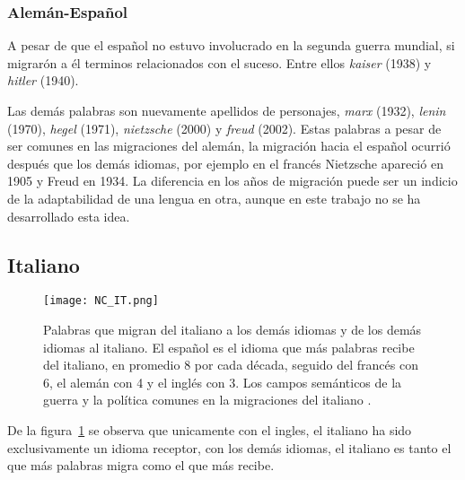 

  
\subsubsection*{Alemán-Español}%

A pesar de que el español no estuvo involucrado en la segunda guerra mundial, si migrarón a él terminos relacionados con el suceso.  Entre ellos \textit{kaiser} (1938) y \textit{hitler} (1940). 

Las demás palabras son nuevamente  apellidos de personajes, \textit{marx} (1932), \textit{lenin} (1970), \textit{hegel} (1971),  \textit{nietzsche} (2000) y \textit{freud} (2002). Estas palabras a pesar de ser comunes en las migraciones del alemán, la migración hacia el español ocurrió después que los demás idiomas, por ejemplo en el francés Nietzsche apareció en 1905 y Freud en 1934. La diferencia en los años de migración puede ser un indicio de la adaptabilidad de una lengua en otra, aunque en este trabajo no se ha desarrollado esta idea. 





\clearpage
\subsection{Italiano}
 
 
\begin{figure}[h!]
	\centering
	\texttt{[image: NC\_IT.png]}
	\caption{Palabras que migran del italiano a los demás idiomas y de los demás idiomas al italiano.  El español es el idioma que más palabras recibe del italiano, en promedio 8 por cada década, seguido del francés con 6,  el alemán con 4 y el inglés con 3. Los campos semánticos de la guerra y la política comunes en la migraciones del italiano .} 
	\label{fig.NC_IT}
\end{figure}



De la figura~\ref{fig.NC_IT} se observa que unicamente con el ingles, el italiano ha sido exclusivamente un idioma receptor,  con los demás idiomas,  el italiano es tanto el que más palabras migra como el que más recibe. 

